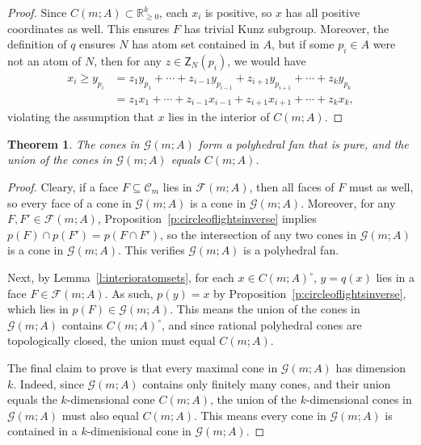 \documentclass[10pt,a4paper]{amsart}
\newcommand\RR{\mathbb{R}}
\newcommand\cC{{\mathcal C}}
\newtheorem{thm}{Theorem}[section]
\theoremstyle{definition}\newtheorem{defi}[thm]{Definition}
\begin{document}
\begin{proof}
Since $C(m;A) \subset \RR_{\ge 0}^k$, each $x_i$ is positive, so $x$ has all positive coordinates as well.  This ensures $F$ has trivial Kunz subgroup.  Moreover, the definition of $q$ ensures $N$ has atom set contained in $A$, but if some $p_i \in A$ were not an atom of $N$, then for any $z \in \mathsf Z_N(p_i)$, we would have 
\begin{align*}
x_i
\ge y_{p_i}
&= z_1 y_{p_1} + \cdots + z_{i-1} y_{p_{i-1}} + z_{i+1} y_{p_{i+1}} + \cdots + z_k y_{p_k} \\
&= z_1 x_1 + \cdots + z_{i-1} x_{i-1} + z_{i+1} x_{i+1} + \cdots + z_k x_k,
\end{align*}
violating the assumption that $x$ lies in the interior of $C(m;A)$.  
\end{proof}

\begin{thm}\label{t:purefan}
The cones in $\mathcal G(m;A)$ form a polyhedral fan that is pure, and the union of the cones in $\mathcal G(m;A)$ equals $C(m;A)$.  
\end{thm}

\begin{proof}
Cleary, if a face $F \subseteq \cC_m$ lies in $\mathcal F(m;A)$, then all faces of $F$ must as well, so every face of a cone in $\mathcal G(m;A)$ is a cone in $\mathcal G(m;A)$.  Moreover, for any \mbox{$F, F' \in \mathcal F(m;A)$}, Proposition~\ref{p:circleoflightsinverse} implies $p(F) \cap p(F') = p(F \cap F')$, so the intersection of any two cones in $\mathcal G(m;A)$ is a cone in $\mathcal G(m;A)$.  This verifies $\mathcal G(m;A)$ is a polyhedral fan.  

Next, by Lemma~\ref{l:interioratomsets}, for each $x \in C(m;A)^\circ$, $y = q(x)$ lies in a face $F \in \mathcal F(m;A)$.   
As such, $p(y) = x$ by Proposition~\ref{p:circleoflightsinverse}, which lies in $p(F) \in \mathcal G(m;A)$.  This means the union of the cones in $\mathcal G(m;A)$ contains $C(m;A)^\circ$, and since rational polyhedral cones are topologically closed, the union must equal $C(m;A)$.  

The final claim to prove is that every maximal cone in $\mathcal G(m;A)$ has dimension $k$.  Indeed, since $\mathcal G(m;A)$ contains only finitely many cones, and their union equals the $k$-dimensional cone $C(m;A)$, the union of the $k$-dimensional cones in $\mathcal G(m;A)$ must also equal $C(m;A)$.  This means every cone in $\mathcal G(m;A)$ is contained in a $k$-dimenisional cone in $\mathcal G(m;A)$.  
\end{proof}
\end{document}
